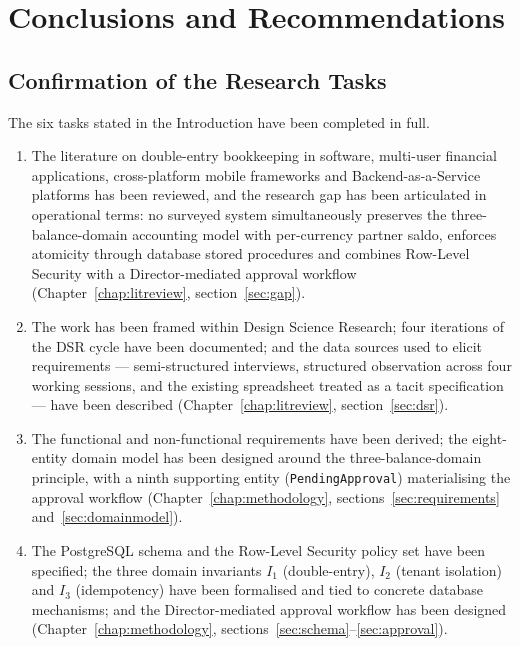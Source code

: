 \chapter*{Conclusions and Recommendations}
\label{chap:conclusions}

\section*{Confirmation of the Research Tasks}
The six tasks stated in the Introduction have been completed in full.

\begin{enumerate}[leftmargin=1.2cm]
  \item The literature on double-entry bookkeeping in software, multi-user financial applications, cross-platform mobile frameworks and Backend-as-a-Service platforms has been reviewed, and the research gap has been articulated in operational terms: no surveyed system simultaneously preserves the three-balance-domain accounting model with per-currency partner saldo, enforces atomicity through database stored procedures and combines Row-Level Security with a Director-mediated approval workflow (Chapter~\ref{chap:litreview}, section~\ref{sec:gap}).
  \item The work has been framed within Design Science Research; four iterations of the DSR cycle have been documented; and the data sources used to elicit requirements --- semi-structured interviews, structured observation across four working sessions, and the existing spreadsheet treated as a tacit specification --- have been described (Chapter~\ref{chap:litreview}, section~\ref{sec:dsr}).
  \item The functional and non-functional requirements have been derived; the eight-entity domain model has been designed around the three-balance-domain principle, with a ninth supporting entity (\texttt{PendingApproval}) materialising the approval workflow (Chapter~\ref{chap:methodology}, sections~\ref{sec:requirements} and~\ref{sec:domainmodel}).
  \item The PostgreSQL schema and the Row-Level Security policy set have been specified; the three domain invariants $I_1$ (double-entry), $I_2$ (tenant isolation) and $I_3$ (idempotency) have been formalised and tied to concrete database mechanisms; and the Director-mediated approval workflow has been designed (Chapter~\ref{chap:methodology}, sections~\ref{sec:schema}--\ref{sec:approval}).

\end{enumerate}
